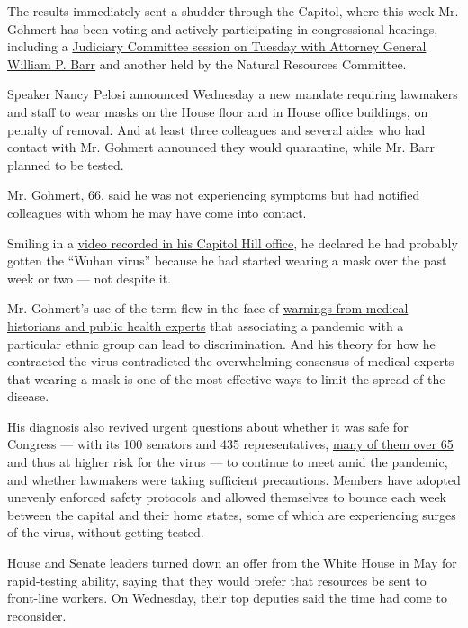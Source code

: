 The results immediately sent a shudder through the Capitol, where this
week Mr. Gohmert has been voting and actively participating in
congressional hearings, including a
\href{https://www.nytimes3xbfgragh.onion/2020/07/28/us/politics/barr-testimony.html}{Judiciary
Committee session on Tuesday with Attorney General William P. Barr} and
another held by the Natural Resources Committee.

Speaker Nancy Pelosi announced Wednesday a new mandate requiring
lawmakers and staff to wear masks on the House floor and in House office
buildings, on penalty of removal. And at least three colleagues and
several aides who had contact with Mr. Gohmert announced they would
quarantine, while Mr. Barr planned to be tested.

Mr. Gohmert, 66, said he was not experiencing symptoms but had notified
colleagues with whom he may have come into contact.

Smiling in a
\href{https://twitter.com/replouiegohmert/status/1288522631000489985?s=20}{video
recorded in his Capitol Hill office}, he declared he had probably gotten
the ``Wuhan virus'' because he had started wearing a mask over the past
week or two --- not despite it.

Mr. Gohmert's use of the term flew in the face of
\href{https://www.nytimes3xbfgragh.onion/2020/03/18/us/politics/china-virus.html}{warnings
from medical historians and public health experts} that associating a
pandemic with a particular ethnic group can lead to discrimination. And
his theory for how he contracted the virus contradicted the overwhelming
consensus of medical experts that wearing a mask is one of the most
effective ways to limit the spread of the disease.

His diagnosis also revived urgent questions about whether it was safe
for Congress --- with its 100 senators and 435 representatives,
\href{https://www.nytimes3xbfgragh.onion/2020/03/11/upshot/coronavirus-older-lawmakers-congress-risk.html}{many
of them over 65} and thus at higher risk for the virus --- to continue
to meet amid the pandemic, and whether lawmakers were taking sufficient
precautions. Members have adopted unevenly enforced safety protocols and
allowed themselves to bounce each week between the capital and their
home states, some of which are experiencing surges of the virus, without
getting tested.

House and Senate leaders turned down an offer from the White House in
May for rapid-testing ability, saying that they would prefer that
resources be sent to front-line workers. On Wednesday, their top
deputies said the time had come to reconsider.

